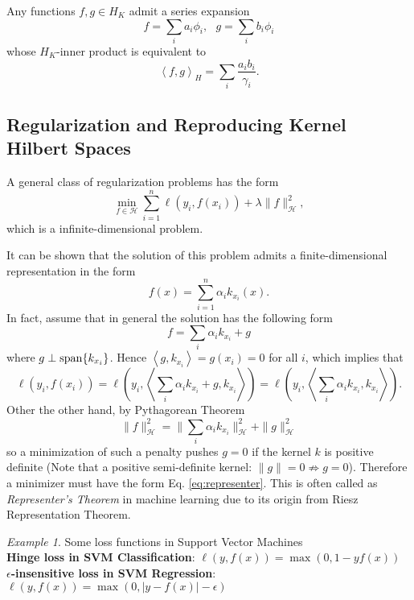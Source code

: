 \documentclass[twoside]{article}
\theoremstyle{definition}
\theoremstyle{definition}
\theoremstyle{remark}
\newtheorem*{example}{Example}
\def\span{{\rm span}}
\begin{document}
Any functions $f,g\in H_K$ admit a series expansion
\[ f = \sum_i a_i \phi_i,  \ \ \ g=\sum_i b_i \phi_i \]
whose $H_K$-inner product is equivalent to  
\[ \left<f, g\right>_H = \sum_i \frac{a_i b_i}{\gamma_i}. \]


\subsection{Regularization and Reproducing Kernel Hilbert Spaces}
A general class of regularization problems has the form 
$$\min\limits_{f\in \mathcal{H}} \sum\limits_{i=1}^n \ell(y_i,f(x_i)) +\lambda \|f\|^2_{\mathcal{H}},$$
which is a infinite-dimensional problem. 

It can be shown that the solution of this problem admits a finite-dimensional representation in the form 
\begin{equation}
\label{eq:representer} 
f(x) = \sum\limits_{i=1}^n \alpha_ik_{x_i}(x) .
\end{equation}
In fact, assume that in general the solution has the following form
\[ f = \sum_i \alpha_i k_{x_i} + g \] 
where $g \perp \span\{k_{x_i}\}$. Hence $\left< g, k_{x_i}\right> = g(x_i)=0$ for all $i$, which implies that
\[ \ell(y_i,f(x_i)) = \ell(y_i, \left< \sum_i \alpha_i k_{x_i} + g, k_{x_i}\right>) = \ell(y_i, \left< \sum_i \alpha_i k_{x_i}, k_{x_i}\right>). \]
Other the other hand, by Pythagorean Theorem
\[ \|f\|^2_{\mathcal H} = \|\sum_i \alpha_i k_{x_i} \|^2_{\mathcal H} + \|g\|^2_{\mathcal H} \]
so a minimization of such a penalty pushes $g = 0$ if the kernel $k$ is positive definite (Note that a positive semi-definite kernel: $\|g\|=0\not\Rightarrow g=0$). Therefore a minimizer must have the form Eq. \cref{eq:representer}. This is often called as \emph{Representer's Theorem} in machine learning due to its origin from Riesz Representation Theorem. 

\begin{example} Some loss functions in Support Vector Machines \\
\textbf{Hinge loss in SVM Classification}: $\ell(y,f(x)) = \max(0, 1-yf(x))$\\
\textbf{ $\epsilon$-insensitive loss in SVM Regression}: $\ell(y,f(x)) = \max(0, |y-f(x)|-\epsilon)$
\end{example}
\end{document}
